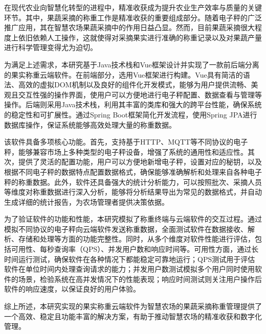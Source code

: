 在现代农业向智慧化转型的进程中，精准收获成为提升农业生产效率与质量的关键环节。其中，果蔬采摘的称重工作是精准收获的重要组成部分。随着电子秤的广泛推广应用，其在智慧农场果蔬采摘中的作用日益凸显。然而，目前果蔬采摘很大程度上依旧依赖人工操作，这就使得对采摘果实进行准确的称重记录以及对果蔬产量进行科学管理变得尤为迫切。

为满足上述需求，本研究基于Java技术栈和Vue框架设计并实现了一款前后端分离的果实称重云端软件。在前端部分，选用Vue框架进行构建。Vue具有简洁的语法、高效的虚拟DOM机制以及良好的组件化开发模式，能够为用户提供流畅、美观且交互性强的操作界面，使用户可以方便地进行电子秤配置、数据查看与管理等操作。后端则采用Java技术栈，利用其丰富的类库和强大的跨平台性能，确保系统的稳定性和可扩展性。通过Spring Boot框架简化开发流程，使用Spring JPA进行数据库操作，保证系统能够高效处理大量的称重数据。

该软件具备多项核心功能。首先，支持基于HTTP、MQTT等不同协议的电子秤，能够兼容市场上多种类型的电子秤设备，增强了系统的通用性和适应性。其次，提供了灵活的配置功能，用户可以方便地新增电子秤，设置对应的秘钥，以及根据不同电子秤的数据特点配置数据格式，确保能够准确解析和处理来自各种电子秤的称重数据。此外，软件还具备强大的统计分析能力，可以按照批次、采摘人员等维度对称重数据进行深入分析，能够将分析结果导出为常见的数据格式，并自动生成详细的统计报告，为农场管理者提供决策依据。

为了验证软件的功能和性能，本研究模拟了称重终端与云端软件的交互过程。通过模拟不同协议的电子秤向云端软件发送称重数据，全面测试软件在数据接收、解析、存储和处理等方面的功能完整性。同时，从多个维度对软件性能进行评估，包括可用性、每秒查询率（QPS）、并发用户数和响应时间等。可用性方面，通过长时间运行测试，确保软件在各种情况下都能稳定可靠地运行；QPS测试用于评估软件在单位时间内处理查询请求的能力；并发用户数测试模拟多个用户同时使用软件的场景，检验系统在高并发情况下的性能表现；响应时间测试则关注用户操作后软件的响应速度，以保证良好的用户体验。

综上所述，本研究实现的果实称重云端软件为智慧农场的果蔬采摘称重管理提供了一个高效、稳定且功能丰富的解决方案，有助于推动智慧农场的精准收获和数字化管理。 